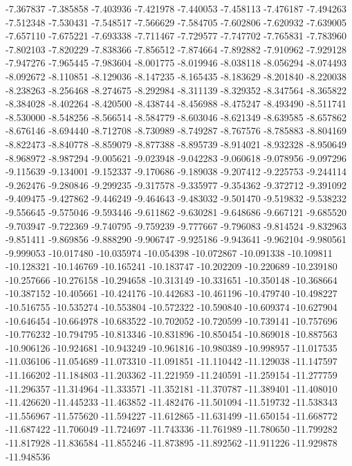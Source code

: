 -7.367837
-7.385858
-7.403936
-7.421978
-7.440053
-7.458113
-7.476187
-7.494263
-7.512348
-7.530431
-7.548517
-7.566629
-7.584705
-7.602806
-7.620932
-7.639005
-7.657110
-7.675221
-7.693338
-7.711467
-7.729577
-7.747702
-7.765831
-7.783960
-7.802103
-7.820229
-7.838366
-7.856512
-7.874664
-7.892882
-7.910962
-7.929128
-7.947276
-7.965445
-7.983604
-8.001775
-8.019946
-8.038118
-8.056294
-8.074493
-8.092672
-8.110851
-8.129036
-8.147235
-8.165435
-8.183629
-8.201840
-8.220038
-8.238263
-8.256468
-8.274675
-8.292984
-8.311139
-8.329352
-8.347564
-8.365822
-8.384028
-8.402264
-8.420500
-8.438744
-8.456988
-8.475247
-8.493490
-8.511741
-8.530000
-8.548256
-8.566514
-8.584779
-8.603046
-8.621349
-8.639585
-8.657862
-8.676146
-8.694440
-8.712708
-8.730989
-8.749287
-8.767576
-8.785883
-8.804169
-8.822473
-8.840778
-8.859079
-8.877388
-8.895739
-8.914021
-8.932328
-8.950649
-8.968972
-8.987294
-9.005621
-9.023948
-9.042283
-9.060618
-9.078956
-9.097296
-9.115639
-9.134001
-9.152337
-9.170686
-9.189038
-9.207412
-9.225753
-9.244114
-9.262476
-9.280846
-9.299235
-9.317578
-9.335977
-9.354362
-9.372712
-9.391092
-9.409475
-9.427862
-9.446249
-9.464643
-9.483032
-9.501470
-9.519832
-9.538232
-9.556645
-9.575046
-9.593446
-9.611862
-9.630281
-9.648686
-9.667121
-9.685520
-9.703947
-9.722369
-9.740795
-9.759239
-9.777667
-9.796083
-9.814524
-9.832963
-9.851411
-9.869856
-9.888290
-9.906747
-9.925186
-9.943641
-9.962104
-9.980561
-9.999053
-10.017480
-10.035974
-10.054398
-10.072867
-10.091338
-10.109811
-10.128321
-10.146769
-10.165241
-10.183747
-10.202209
-10.220689
-10.239180
-10.257666
-10.276158
-10.294658
-10.313149
-10.331651
-10.350148
-10.368664
-10.387152
-10.405661
-10.424176
-10.442683
-10.461196
-10.479740
-10.498227
-10.516755
-10.535274
-10.553804
-10.572322
-10.590840
-10.609374
-10.627904
-10.646454
-10.664978
-10.683522
-10.702052
-10.720599
-10.739141
-10.757696
-10.776232
-10.794795
-10.813346
-10.831896
-10.850454
-10.869018
-10.887563
-10.906126
-10.924681
-10.943249
-10.961816
-10.980389
-10.998957
-11.017535
-11.036106
-11.054689
-11.073310
-11.091851
-11.110442
-11.129038
-11.147597
-11.166202
-11.184803
-11.203362
-11.221959
-11.240591
-11.259154
-11.277759
-11.296357
-11.314964
-11.333571
-11.352181
-11.370787
-11.389401
-11.408010
-11.426620
-11.445233
-11.463852
-11.482476
-11.501094
-11.519732
-11.538343
-11.556967
-11.575620
-11.594227
-11.612865
-11.631499
-11.650154
-11.668772
-11.687422
-11.706049
-11.724697
-11.743336
-11.761989
-11.780650
-11.799282
-11.817928
-11.836584
-11.855246
-11.873895
-11.892562
-11.911226
-11.929878
-11.948536
